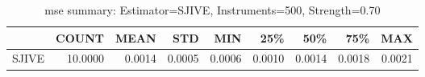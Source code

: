 \begin{table}[ht]
\centering
\caption{mse summary: Estimator=SJIVE, Instruments=500, Strength=0.70}
\begin{tabular}{lrrrrrrrr}
\toprule
 & COUNT & MEAN & STD & MIN & 25\% & 50\% & 75\% & MAX \\
\midrule
SJIVE & 10.0000 & 0.0014 & 0.0005 & 0.0006 & 0.0010 & 0.0014 & 0.0018 & 0.0021 \\
\bottomrule
\end{tabular}
\end{table}
